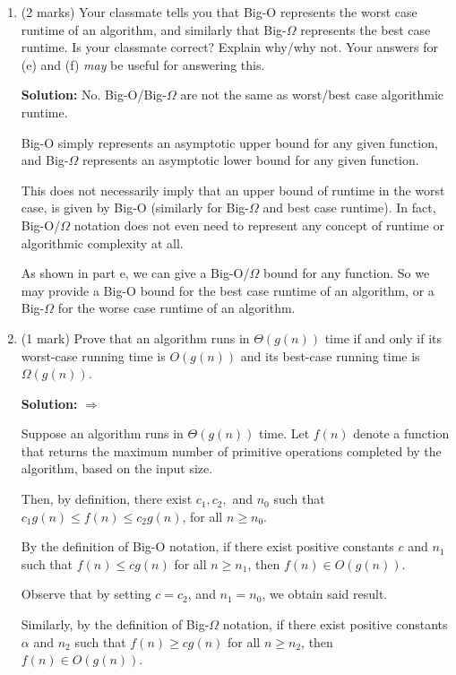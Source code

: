 \documentclass[a4,13pt]{extarticle}
\newenvironment{Solution}{\color{blue}\textbf{Solution:}}{}
\begin{document}
\begin{enumerate}
\begin{enumerate}
	      	\item (2 marks) Your classmate tells you that Big-O represents the worst case runtime of an algorithm, and similarly that 
	      	      Big-$\Omega$ represents the best case runtime. Is your classmate correct? Explain why/why not. 
	      	      Your answers for (e) and (f) \textit{may} be useful for answering this.
	      	      
	      	\begin{Solution}
No. Big-O/Big-$\Omega$ are not the same as worst/best case algorithmic runtime.

Big-O simply represents an asymptotic upper bound for any given function, and Big-$\Omega$ represents an asymptotic lower bound for any given function.

This does not necessarily imply that an upper bound of runtime in the worst case, is given by Big-O (similarly for Big-$\Omega$ and best case runtime). In fact, Big-O/$\Omega$ notation does not even need to represent any concept of runtime or algorithmic complexity at all.

As shown in part e, we can give a Big-O/$\Omega$ bound for any function. So we may provide a Big-O bound for the best case runtime of an algorithm, or a Big-$\Omega$ for the worse case runtime of an algorithm.
	      	\end{Solution}
	      	      	      	                  
	      	\item (1 mark) Prove that an algorithm runs in $\Theta (g(n))$ time if and only if its worst-case running time 
	      	      is $O(g(n))$ and its best-case running time is $\Omega(g(n))$.
	      	      
	      	\begin{Solution}
$\Rightarrow$

Suppose an algorithm runs in $\Theta(g(n))$ time. Let $f(n)$ denote a function that returns the maximum number of primitive operations completed by the algorithm, based on the input size.

Then, by definition, there exist $c_1, c_2,$ and $n_0$ such that $c_1g(n)\le f(n)\le c_2g(n)$, for all $n\ge n_0$.

By the definition of Big-O notation, if there exist positive constants $c$ and $n_1$ such that $f(n)\le cg(n)$ for all $n\geq n_1$, then $f(n)\in O(g(n))$.

Observe that by setting $c=c_2$, and $n_1=n_0$, we obtain said result.

Similarly, by the definition of Big-$\Omega$ notation, if there exist positive constants $\alpha$ and $n_2$ such that $f(n)\ge cg(n)$ for all $n\geq n_2$, then $f(n)\in O(g(n))$.


\end{Solution}
\end{enumerate}
\end{enumerate}
\end{document}
